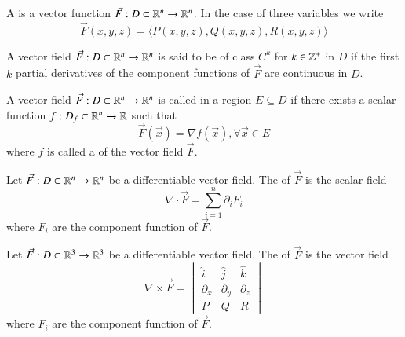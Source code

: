 \documentclass[12pt, a4paper, oneside, openright, titlepage]{book}
\begin{document}
\begin{appendices}
    \begin{defn}
        A  is a vector function $\vec{F}:D\subset \mathbb R^n \rightarrow \mathbb R^n$. In the case of three variables we write \begin{equation}
            \vec{F}(x,y,z) = \langle P(x,y,z), Q(x,y,z), R(x,y,z)\rangle
        \end{equation}
    \end{defn}
    
    \begin{rmk}
        A vector field $\vec{F}:D\subset \mathbb R^n \rightarrow \mathbb R^n$ is said to be of class $C^k$ for $k \in \mathbb Z^{+}$ in $D$ if the first $k$ partial derivatives of the component functions of $\vec{F}$ are continuous in $D$.
    \end{rmk}
    
    \begin{defn}
        A vector field $\vec{F}:D\subset \mathbb R^n \rightarrow \mathbb R^n$ is called  in a region $E \subseteq D$ if there exists a scalar function $f:D_f \subset \mathbb R^n \rightarrow \mathbb R$ such that \begin{equation}
            \vec{F}(\vec{x}) = \nabla f(\vec{x}), \forall \vec{x} \in E
        \end{equation}
        where $f$ is called a  of the vector field $\vec{F}$.
    \end{defn}
    
    \begin{defn}
        Let $\vec{F}:D\subset \mathbb R^n \rightarrow \mathbb R^n$ be a differentiable vector field. The  of $\vec{F}$ is the scalar field \begin{equation}
            \nabla\cdot \vec{F} = \sum\limits_{i=1}^n\partial_iF_i
        \end{equation}
        where $F_i$ are the component function of $\vec{F}$.
    \end{defn}
    
    \begin{defn}
        Let $\vec{F}:D\subset \mathbb R^3 \rightarrow \mathbb R^3$ be a differentiable vector field. The  of $\vec{F}$ is the vector field \begin{equation}
            \nabla\times \vec{F} = \begin{vmatrix} \hat{i} & \hat{j} & \hat{k} \\ \partial_x & \partial_y & \partial_z \\ P & Q & R \end{vmatrix}
        \end{equation}
        where $F_i$ are the component function of $\vec{F}$.
    \end{defn}
    

\end{appendices}
\end{document}
